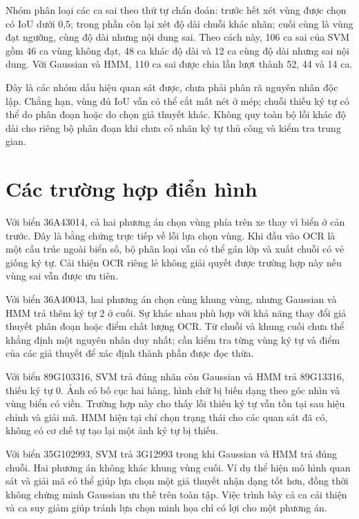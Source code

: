 Nhóm phân loại các ca sai theo thứ tự chẩn đoán: trước hết xét vùng được chọn có IoU dưới 0,5; trong phần còn lại xét độ dài chuỗi khác nhãn; cuối cùng là vùng đạt ngưỡng, cùng độ dài nhưng nội dung sai. Theo cách này, 106 ca sai của SVM gồm 46 ca vùng không đạt, 48 ca khác độ dài và 12 ca cùng độ dài nhưng sai nội dung. Với Gaussian và HMM, 110 ca sai được chia lần lượt thành 52, 44 và 14 ca.

Đây là các nhóm dấu hiệu quan sát được, chưa phải phân rã nguyên nhân độc lập. Chẳng hạn, vùng đủ IoU vẫn có thể cắt mất nét ở mép; chuỗi thiếu ký tự có thể do phân đoạn hoặc do chọn giả thuyết khác. Không quy toàn bộ lỗi khác độ dài cho riêng bộ phân đoạn khi chưa có nhãn ký tự thủ công và kiểm tra trung gian.

\section{Các trường hợp điển hình}

Với biển 36A43014, cả hai phương án chọn vùng phía trên xe thay vì biển ở cản trước. Đây là bằng chứng trực tiếp về lỗi lựa chọn vùng. Khi đầu vào OCR là một cấu trúc ngoài biển số, bộ phân loại vẫn có thể gán lớp và xuất chuỗi có vẻ giống ký tự. Cải thiện OCR riêng lẻ không giải quyết được trường hợp này nếu vùng sai vẫn được ưu tiên.

Với biển 36A40043, hai phương án chọn cùng khung vùng, nhưng Gaussian và HMM trả thêm ký tự 2 ở cuối. Sự khác nhau phù hợp với khả năng thay đổi giả thuyết phân đoạn hoặc điểm chất lượng OCR. Từ chuỗi và khung cuối chưa thể khẳng định một nguyên nhân duy nhất; cần kiểm tra từng vùng ký tự và điểm của các giả thuyết để xác định thành phần được đọc thừa.

Với biển 89G103316, SVM trả đúng nhãn còn Gaussian và HMM trả 89G13316, thiếu ký tự 0. Ảnh có bố cục hai hàng, hình chữ bị biến dạng theo góc nhìn và vùng biển có viền. Trường hợp này cho thấy lỗi thiếu ký tự vẫn tồn tại sau hiệu chỉnh và giải mã. HMM hiện tại chỉ chọn trạng thái cho các quan sát đã có, không có cơ chế tự tạo lại một ảnh ký tự bị thiếu.

Với biển 35G102993, SVM trả 3G12993 trong khi Gaussian và HMM trả đúng chuỗi. Hai phương án không khác khung vùng cuối. Ví dụ thể hiện mô hình quan sát và giải mã có thể giúp lựa chọn một giả thuyết nhận dạng tốt hơn, đồng thời không chứng minh Gaussian ưu thế trên toàn tập. Việc trình bày cả ca cải thiện và ca suy giảm giúp tránh lựa chọn minh họa chỉ có lợi cho một phương án.

